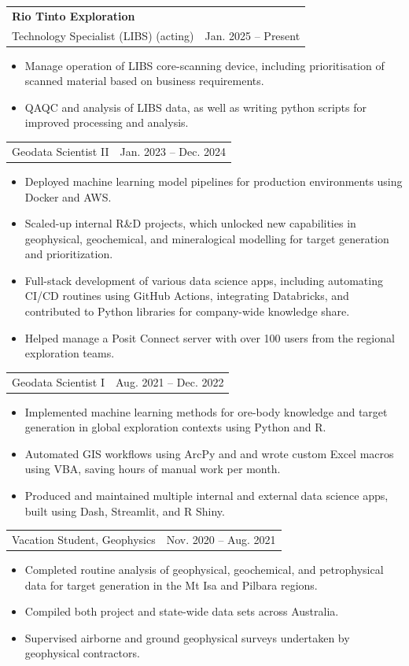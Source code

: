 \documentclass[letterpaper,11pt]{article}
\makeatletter
\newcommand{\resumeItem}[2]{
  \item\small{
    \textbf{#1}{#2 \vspace{-2pt}}
  }
}
\newcommand{\resumeSubheading}[4]{
  \vspace{-1pt}\item
    \begin{tabular*}{0.97\textwidth}[t]{l@{\extracolsep{\fill}}r}
      \textbf{#1} & #2 \\
      {\small #3} & {\small #4} \\
    \end{tabular*}\vspace{-5pt}
}
\newcommand{\resumeSubSubheading}[2]{
    \begin{tabular*}{0.97\textwidth}{l@{\extracolsep{\fill}}r}
      {\small#1} & {\small #2} \\
    \end{tabular*}\vspace{-5pt}
}
\newcommand{\resumeItemListStart}{\begin{itemize}}
\newcommand{\resumeItemListEnd}{\end{itemize}\vspace{-5pt}}
\makeatother
\begin{document}
    \resumeSubheading
      {Rio Tinto Exploration}{} 
      {Technology Specialist (LIBS) (acting)}{Jan. 2025 -- Present}
      \resumeItemListStart
        \resumeItem{}{
            Manage operation of LIBS core-scanning device, including prioritisation of scanned material based on business requirements. 
        }
        \resumeItem{}{
            QAQC and analysis of LIBS data, as well as writing python scripts for improved processing and analysis.
        }
      \resumeItemListEnd
      \resumeSubSubheading %
        {Geodata Scientist II}{Jan. 2023 -- Dec. 2024}
      \resumeItemListStart
        \resumeItem{}{
            Deployed machine learning model pipelines for production environments using Docker and AWS.
        }
        \resumeItem{}{
            Scaled-up internal R\&D projects, which unlocked new capabilities in geophysical, geochemical, and mineralogical modelling for target generation and prioritization.
        }
        \resumeItem{}{
            Full-stack development of various data science apps, including automating CI/CD routines using GitHub Actions, integrating Databricks, and contributed to Python libraries for company-wide knowledge share.
        }
        \resumeItem{}{
            Helped manage a Posit Connect server with over 100 users from the regional exploration teams.
        }
      \resumeItemListEnd
      \resumeSubSubheading %
        {Geodata Scientist I}{Aug. 2021 -- Dec. 2022}
      \resumeItemListStart
        \resumeItem{}{
            Implemented machine learning methods for ore-body knowledge and target generation in global exploration contexts using Python and R.
        }
        \resumeItem{}{
            Automated GIS workflows using ArcPy and and wrote custom Excel macros using VBA, saving hours of manual work per month.
        }
        \resumeItem{}{
            Produced and maintained multiple internal and external data science apps, built using Dash, Streamlit, and R Shiny.
        }
      \resumeItemListEnd
    \resumeSubSubheading %
     {Vacation Student, Geophysics}{Nov. 2020 -- Aug. 2021}
     \resumeItemListStart
        \resumeItem{}
          {Completed routine analysis of geophysical, geochemical, and petrophysical data for target generation in the Mt Isa and Pilbara regions.}
        \resumeItem{}
          {Compiled both project and state-wide data sets across Australia.}
        \resumeItem{}
          {Supervised airborne and ground geophysical surveys undertaken by geophysical contractors.}
     \resumeItemListEnd
\end{document}
